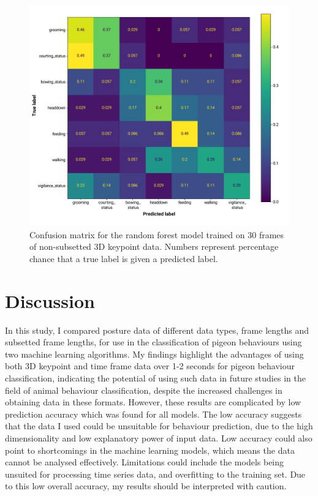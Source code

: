 \documentclass[11pt, letterpaper]{article} %
\begin{document}
    
    \begin{figure}[htbp]
        \centering
        \includegraphics[width=1\linewidth]{CF_rf3030.pdf}
        \caption{Confusion matrix for the random forest model trained on 30 frames of non-subsetted 3D keypoint data. Numbers represent percentage chance that a true label is given a predicted label.}
        \label{fig:confusion_matrix}
    \end{figure}






\newpage
\section{Discussion}

In this study, I compared posture data of different data types, frame lengths and subsetted frame lengths, for use in the classification of pigeon behaviours using two machine learning algorithms. 
%
My findings highlight the advantages of using both 3D keypoint and time frame data over 1-2 seconds for pigeon behaviour classification, indicating the potential of using such data in future studies in the field of animal behaviour classification, despite the increased challenges in obtaining data in these formats.
%
However, these results are complicated by low prediction accuracy which was found for all models. The low accuracy suggests that the data I used could be unsuitable for behaviour prediction, due to the high dimensionality and low explanatory power of input data. Low accuracy could also point to shortcomings in the machine learning models, which means the data cannot be analysed effectively. Limitations could include the models being unsuited for processing time series data, and overfitting to the training set. Due to this low overall accuracy, my results should be interpreted with caution. \\
\end{document}
